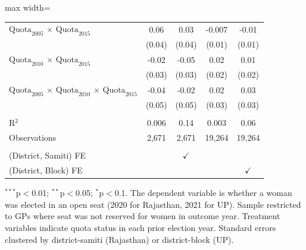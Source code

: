 \begin{adjustbox}{max width=\linewidth}
\begin{threeparttable}[b]
\begin{tabular}{lcccc}
         $\text{Quota}_{2005}$ $\times$ $\text{Quota}_{2015}$                                     & 0.06         & 0.03          & -0.007       & -0.01\\   
                                                                                                  & (0.04)       & (0.04)        & (0.01)       & (0.01)\\   
         $\text{Quota}_{2010}$ $\times$ $\text{Quota}_{2015}$                                     & -0.02        & -0.05         & 0.02         & 0.01\\   
                                                                                                  & (0.03)       & (0.03)        & (0.02)       & (0.02)\\   
         $\text{Quota}_{2005}$ $\times$ $\text{Quota}_{2010}$ $\times$ $\text{Quota}_{2015}$      & -0.04        & -0.02         & 0.02         & 0.03\\   
                                                                                                  & (0.05)       & (0.05)        & (0.03)       & (0.03)\\   
          \\
         R$^2$                                                                                    & 0.006        & 0.14          & 0.003        & 0.06\\  
         Observations                                                                             & 2,671        & 2,671         & 19,264       & 19,264\\  
          \\
         (District, Samiti) FE                                                                    &              & $\checkmark$  &              & \\  
         (District, Block) FE                                                                     &              &               &              & $\checkmark$\\   
         \bottomrule
      \end{tabular}
      
      \begin{tablenotes}
         \item $^{***}$p$<$0.01; $^{**}$p$<$0.05; $^{*}$p$<$0.1. The dependent variable is whether a woman was elected in an open seat (2020 for Rajasthan, 2021 for UP). Sample restricted to GPs where seat was not reserved for women in outcome year. Treatment variables indicate quota status in each prior election year. Standard errors clustered by district-samiti (Rajasthan) or district-block (UP).
      \end{tablenotes}
   \end{threeparttable}
\end{adjustbox}
\par\endgroup


